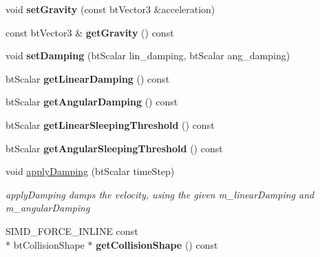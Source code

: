 \begin{DoxyCompactItemize}
\item 
\hypertarget{classbt_rigid_body_a5aedec73517fb7b9cddcbd72663e0ddc}{void {\bfseries set\+Gravity} (const bt\+Vector3 \&acceleration)}\label{classbt_rigid_body_a5aedec73517fb7b9cddcbd72663e0ddc}

\item 
\hypertarget{classbt_rigid_body_a002f83b85d9570e31ca23dc21f081461}{const bt\+Vector3 \& {\bfseries get\+Gravity} () const }\label{classbt_rigid_body_a002f83b85d9570e31ca23dc21f081461}

\item 
\hypertarget{classbt_rigid_body_ace302f6d75db7e4cd64305dd4d20114b}{void {\bfseries set\+Damping} (bt\+Scalar lin\+\_\+damping, bt\+Scalar ang\+\_\+damping)}\label{classbt_rigid_body_ace302f6d75db7e4cd64305dd4d20114b}

\item 
\hypertarget{classbt_rigid_body_a78b752dc9d506aa1d1256f26af75ab01}{bt\+Scalar {\bfseries get\+Linear\+Damping} () const }\label{classbt_rigid_body_a78b752dc9d506aa1d1256f26af75ab01}

\item 
\hypertarget{classbt_rigid_body_aaf24705cf1bfbfff0afa61aa0f61f800}{bt\+Scalar {\bfseries get\+Angular\+Damping} () const }\label{classbt_rigid_body_aaf24705cf1bfbfff0afa61aa0f61f800}

\item 
\hypertarget{classbt_rigid_body_ae0f389515f08132b77b6283bc09c8568}{bt\+Scalar {\bfseries get\+Linear\+Sleeping\+Threshold} () const }\label{classbt_rigid_body_ae0f389515f08132b77b6283bc09c8568}

\item 
\hypertarget{classbt_rigid_body_af238151d2faa8f269c917740800f7c8c}{bt\+Scalar {\bfseries get\+Angular\+Sleeping\+Threshold} () const }\label{classbt_rigid_body_af238151d2faa8f269c917740800f7c8c}

\item 
\hypertarget{classbt_rigid_body_a3fecb8c50d734095f33e2c7624bfba2c}{void \hyperlink{classbt_rigid_body_a3fecb8c50d734095f33e2c7624bfba2c}{apply\+Damping} (bt\+Scalar time\+Step)}\label{classbt_rigid_body_a3fecb8c50d734095f33e2c7624bfba2c}

\begin{DoxyCompactList}\small\item\em apply\+Damping damps the velocity, using the given m\+\_\+linear\+Damping and m\+\_\+angular\+Damping \end{DoxyCompactList}\item 
\hypertarget{classbt_rigid_body_a5f821aa731290a47b6dfcd2e981e69bb}{S\+I\+M\+D\+\_\+\+F\+O\+R\+C\+E\+\_\+\+I\+N\+L\+I\+N\+E const \\*
bt\+Collision\+Shape $\ast$ {\bfseries get\+Collision\+Shape} () const }\label{classbt_rigid_body_a5f821aa731290a47b6dfcd2e981e69bb}


\end{DoxyCompactItemize}
